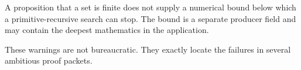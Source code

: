 \begin{warning}
A proposition that a set is finite does not supply a numerical bound below
which a primitive-recursive search can stop.  The bound is a separate producer
field and may contain the deepest mathematics in the application.
\end{warning}

These warnings are not bureaucratic.  They exactly locate the failures in
several ambitious proof packets.
